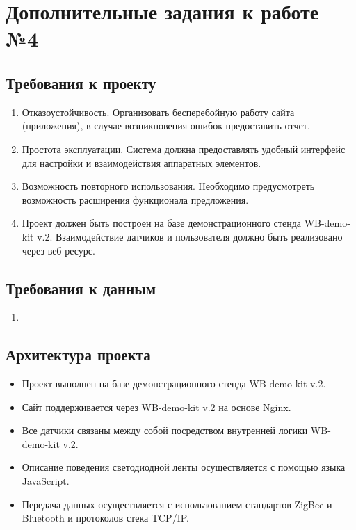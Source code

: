 \documentclass[a4paper,14pt]{extarticle}
\begin{document}
\section{Дополнительные задания к работе №4}
\subsection{Требования к проекту}
\begin{enumerate}
	\item Отказоустойчивость. Организовать бесперебойную работу сайта (приложения), в случае возникновения ошибок предоставить отчет.
	
	\item Простота эксплуатации. Система должна предоставлять удобный интерфейс для настройки и взаимодействия аппаратных элементов.
	
	\item Возможность повторного использования. Необходимо предусмотреть возможность расширения функционала предложения.
	
	\item Проект должен быть построен на базе демонстрационного стенда WB-demo-kit v.2. Взаимодействие датчиков и пользователя должно быть реализовано через веб-ресурс.
\end{enumerate}
\subsection{Требования к данным}
\begin{enumerate}
	\item 
\end{enumerate}
\subsection{Архитектура проекта}
\begin{itemize}
	\item Проект выполнен на базе демонстрационного стенда WB-demo-kit v.2.
	
	\item Сайт поддерживается через WB-demo-kit v.2 на основе Nginx.
	
	\item Все датчики связаны между собой посредством внутренней логики WB-demo-kit v.2.
	
	\item Описание поведения светодиодной ленты осуществляется с помощью языка JavaScript.
	\item Передача данных осуществляется с использованием стандартов ZigBee и Bluetooth и протоколов стека TCP/IP. 

\end{itemize}
	
\end{document}
